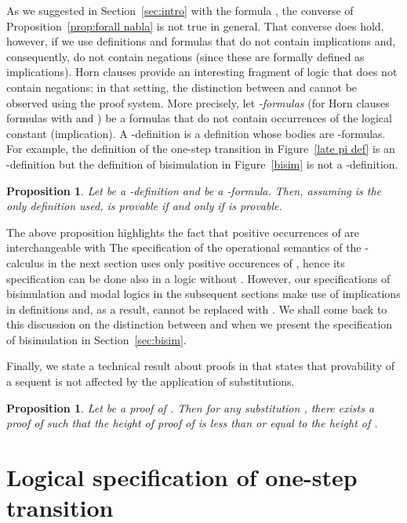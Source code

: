 \documentclass{acmtrans2m}
\newtheorem{proposition}[theorem]{Proposition}
\begin{document}
As we suggested in Section~\ref{sec:intro} with the formula , the converse of
Proposition~\ref{prop:forall nabla} is not true in general.  That
converse does hold, however, if we use definitions and formulas that
do not contain implications and, consequently, do not contain
negations (since these are formally defined as implications).
Horn clauses provide an 
interesting fragment of logic that does not contain negations: in
that setting, the distinction between  and  cannot be
observed using the proof system.  More precisely, let {\em
-formulas} (for Horn clauses formulas with  and
) be a formulas that do not contain occurrences of the logical
constant  (implication).  A -definition is a definition
whose bodies are -formulas.  For example, the definition of the
one-step transition in Figure~\ref{late pi def} is an
-definition but the definition of bisimulation in
Figure~\ref{bisim} is not a -definition.

\begin{proposition}\label{prop:nabla forall}
Let  be a -definition and  be a -formula.
Then, assuming  is the only definition used,  is provable  
if and only if  is provable.
\end{proposition}

The above proposition highlights the fact that positive occurrences of
 are interchangeable with  The specification of the
operational semantics of the -calculus in the next section uses
only positive occurences of , hence its specification can be
done also in a logic without .  However, our specifications of
bisimulation and modal logics in the subsequent sections make use of
implications in definitions and, as a result,  cannot be
replaced with .  We shall come back to this discussion on the
distinction between  and  when we present the
specification of bisimulation in Section~\ref{sec:bisim}.

Finally, we state a technical result about proofs in  that
states that provability of a sequent is not affected by the
application of substitutions.

\begin{proposition}
\label{prop:subst}
Let  be a proof of . 
Then for any substitution , there exists a proof  of 
 such that
the height of proof of  is less than or equal to the height of .
\end{proposition}


\section{Logical specification of one-step transition}
\end{document}
